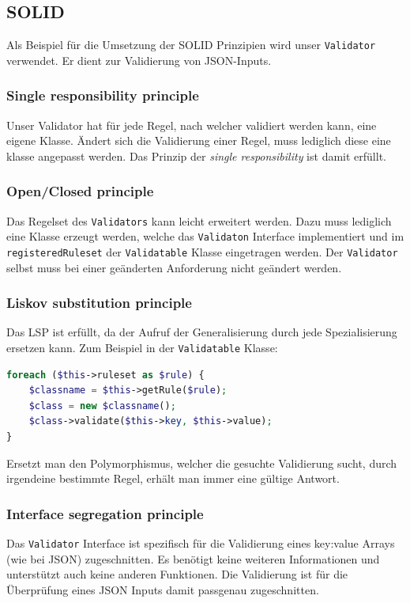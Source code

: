 \documentclass[12pt,a4paper,titlepage,ngerman,pdftex]{report}
\begin{document}
    \subsection{SOLID}
    \label{subsec:solid}
    Als Beispiel für die Umsetzung der SOLID Prinzipien wird unser \verb|Validator| verwendet. Er dient zur Validierung von JSON-Inputs.
    
    \subsubsection{Single responsibility principle}
    Unser Validator hat für jede Regel, nach welcher validiert werden kann, eine eigene Klasse. Ändert sich die Validierung einer Regel, muss lediglich diese eine klasse angepasst werden. Das Prinzip der \textit{single responsibility} ist damit erfüllt.
    \subsubsection{Open/Closed principle}
    Das Regelset des \verb|Validators| kann leicht erweitert werden. Dazu muss lediglich eine Klasse erzeugt werden, welche das \verb|Validaton| Interface implementiert und im \verb|registeredRuleset| der \verb|Validatable| Klasse eingetragen werden. Der \verb|Validator| selbst muss bei einer geänderten Anforderung nicht geändert werden.
    \subsubsection{Liskov substitution principle}
    Das LSP ist erfüllt, da der Aufruf der Generalisierung durch jede Spezialisierung ersetzen kann. Zum Beispiel in der \verb|Validatable| Klasse:
    \begin{lstlisting}[language=php,label={lst:lsp},escapechar=\%,caption={Beispiel Liskov substitution principle}]
foreach ($this->ruleset as $rule) {
    $classname = $this->getRule($rule);
    $class = new $classname();
    $class->validate($this->key, $this->value);
}\end{lstlisting}
	Ersetzt man den Polymorphismus, welcher die gesuchte Validierung sucht, durch irgendeine bestimmte Regel, erhält man immer eine gültige Antwort.
    \subsubsection{Interface segregation principle}
    Das \verb|Validator| Interface ist spezifisch für die Validierung eines key:value Arrays (wie bei JSON) zugeschnitten. Es benötigt keine weiteren Informationen und unterstützt auch keine anderen Funktionen. Die Validierung ist für die Überprüfung eines JSON Inputs damit passgenau zugeschnitten. 
\end{document}
